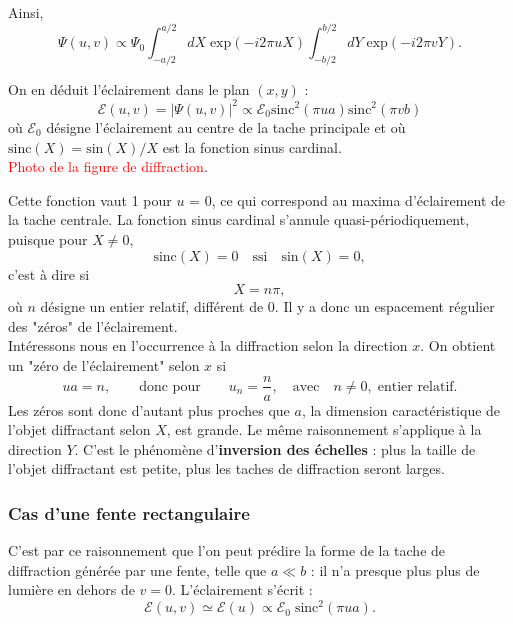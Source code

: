 \documentclass[11pt,a4paper]{report}
\begin{document}
Ainsi,
\begin{equation}
	\Psi(u,v) \propto \Psi_0 \int_{-a/2}^{a/2}dX\; \text{exp}(-i2\pi uX)   \int_{-b/2}^{b/2}dY\; \text{exp}(-i2\pi vY).
\end{equation}

On en déduit l'éclairement dans le plan $(x,y)$ :
\begin{equation}
	\mathcal{E}(u,v) = |\Psi(u,v)|^2 \propto \mathcal{E}_0 \text{sinc}^2(\pi u a) \text{sinc}^2(\pi v b)
\end{equation}
où $\mathcal{E}_0$ désigne l'éclairement au centre de la tache principale et où $\text{sinc}(X) = \text{sin}(X)/X$ est la fonction sinus cardinal.\\

\textcolor{red}{Photo de la figure de diffraction}.

Cette fonction vaut 1 pour $u$ = 0, ce qui correspond au maxima d'éclairement de la tache centrale. La fonction sinus cardinal s'annule quasi-périodiquement, puisque pour $X \neq 0$,
\begin{equation}
	\text{sinc}(X) = 0 \quad\text{ssi}\quad \text{sin}(X) = 0,
\end{equation}
c'est à dire si 
\begin{equation}
	X = n\pi, 
\end{equation}
où $n$ désigne un entier relatif, différent de 0. Il y a donc un espacement régulier des "zéros" de l'éclairement.\\

Intéressons nous en l'occurrence à la diffraction selon la direction $x$. On obtient un "zéro de l'éclairement" selon $x$ si
\begin{equation}
	u a = n, \qquad\text{donc pour}\qquad u_n = \frac{n}{a}, \quad\text{avec}\quad n \neq 0,\; \text{entier relatif}.
\end{equation}
Les zéros sont donc d'autant plus proches que $a$, la dimension caractéristique de l'objet diffractant selon $X$, est grande. Le même raisonnement s'applique à la direction $Y$. C'est le phénomène d'\textbf{inversion des échelles} : plus la taille de l'objet diffractant est petite, plus les taches de diffraction seront larges.

\subsubsection{Cas d'une fente rectangulaire}

C'est par ce raisonnement que l'on peut prédire la forme de la tache de diffraction générée par une fente, telle que $a \ll b$ : il n'a presque plus plus de lumière en dehors de $v = 0$. L'éclairement s'écrit :
\begin{equation}
	\mathcal{E}(u,v) \simeq \mathcal{E}(u) \propto \mathcal{E}_0\;\text{sinc}^2(\pi u a).
\end{equation}
\end{document}
